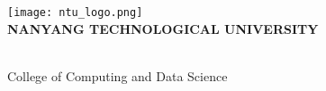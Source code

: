 \makeatletter
\begin{titlepage}
\begin{center}


\texttt{[image: ntu\_logo.png]} 
\\[1cm]

\uppercase{\textbf{\large{Nanyang Technological University}}}
\\[6cm]

\uppercase{\textbf{\large{\@title}}}

\vfill
\@author
\\[3cm]

College of Computing and Data Science

\@date

\end{center}
\end{titlepage}
\makeatother
